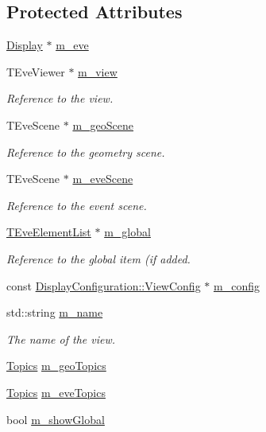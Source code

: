 \subsection*{Protected Attributes}
\begin{DoxyCompactItemize}
\item 
\hyperlink{class_d_d4hep_1_1_display}{Display} $\ast$ \hyperlink{class_d_d4hep_1_1_view_a3ec453c7124cf0d8347acd0b0d2febb5}{m\_\-eve}
\item 
TEveViewer $\ast$ \hyperlink{class_d_d4hep_1_1_view_a6792e4acf7d115519d5390959e7c0306}{m\_\-view}
\begin{DoxyCompactList}\small\item\em Reference to the view. \item\end{DoxyCompactList}\item 
TEveScene $\ast$ \hyperlink{class_d_d4hep_1_1_view_a26d377786acafb43d0fccf8752d2bd79}{m\_\-geoScene}
\begin{DoxyCompactList}\small\item\em Reference to the geometry scene. \item\end{DoxyCompactList}\item 
TEveScene $\ast$ \hyperlink{class_d_d4hep_1_1_view_ae1010f3e7f65ecc82f47cb160a8839c0}{m\_\-eveScene}
\begin{DoxyCompactList}\small\item\em Reference to the event scene. \item\end{DoxyCompactList}\item 
\hyperlink{class_t_eve_element_list}{TEveElementList} $\ast$ \hyperlink{class_d_d4hep_1_1_view_a6faa3880d28177952c6aad166327397a}{m\_\-global}
\begin{DoxyCompactList}\small\item\em Reference to the global item (if added. \item\end{DoxyCompactList}\item 
const \hyperlink{class_d_d4hep_1_1_display_configuration_1_1_view_config}{DisplayConfiguration::ViewConfig} $\ast$ \hyperlink{class_d_d4hep_1_1_view_aa661c16c213fd41f49039a8c0e0a96c9}{m\_\-config}
\item 
std::string \hyperlink{class_d_d4hep_1_1_view_ac43b9e8f976a9731ff808cd6f7fc1ce7}{m\_\-name}
\begin{DoxyCompactList}\small\item\em The name of the view. \item\end{DoxyCompactList}\item 
\hyperlink{class_d_d4hep_1_1_view_aac8510a8567e5e9128020fd81d8f57de}{Topics} \hyperlink{class_d_d4hep_1_1_view_a43c344306103039f764355833cee51c7}{m\_\-geoTopics}
\item 
\hyperlink{class_d_d4hep_1_1_view_aac8510a8567e5e9128020fd81d8f57de}{Topics} \hyperlink{class_d_d4hep_1_1_view_a6d3c5e7719c79fc50b50f575924b5bf5}{m\_\-eveTopics}
\item 
bool \hyperlink{class_d_d4hep_1_1_view_ab3ae217421de575d8db2a4eed72b8629}{m\_\-showGlobal}
\end{DoxyCompactItemize}


